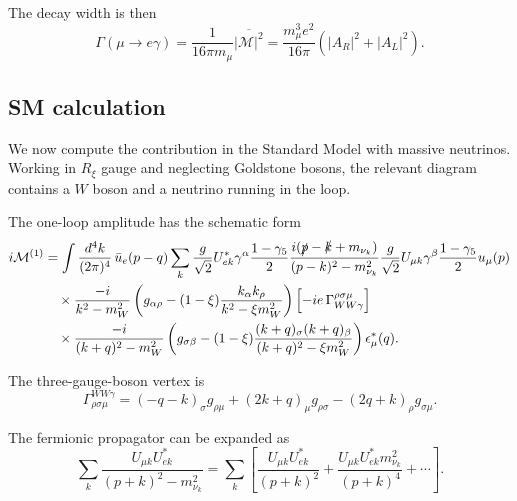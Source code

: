 \documentclass[11pt]{article}
\begin{document}
The decay width is then
\begin{equation}
    \Gamma(\mu \to e\gamma)
    =
    \frac{1}{16\pi m_\mu}
    \overline{|\mathcal{M}|^2}
    =
    \frac{m_\mu^3 e^2}{16\pi}
    \left(
        |A_R|^2 + |A_L|^2
    \right).
\end{equation}

\subsection*{SM calculation}

We now compute the contribution in the Standard Model with massive neutrinos. Working in $R_\xi$ gauge and neglecting Goldstone bosons, the relevant diagram contains a $W$ boson and a neutrino running in the loop.

The one-loop amplitude has the schematic form
\begin{align}
    i\mathcal{M}^{(1)}
    &=
    \int \frac{d^4k}{(2\pi)^4}\,
    \bar{u}_e(p-q)
    \sum_k
    \frac{g}{\sqrt{2}} U^*_{ek}
    \gamma^\alpha
    \frac{1-\gamma_5}{2}
    \frac{i(\slashed{p}-\slashed{k}+m_{\nu_k})}
    {(p-k)^2-m_{\nu_k}^2}
    \frac{g}{\sqrt{2}} U_{\mu k}
    \gamma^\beta
    \frac{1-\gamma_5}{2}
    u_\mu(p)
    \notag \\
    &\quad \times
    \frac{-i}{k^2-m_W^2}
    \left(
        g_{\alpha\rho}
        -
        (1-\xi)\frac{k_\alpha k_\rho}{k^2-\xi m_W^2}
    \right)
    \left[
        -ie\,\Gamma^{\rho\sigma\mu}_{WW\gamma}
    \right]
    \notag \\
    &\quad \times
    \frac{-i}{(k+q)^2-m_W^2}
    \left(
        g_{\sigma\beta}
        -
        (1-\xi)\frac{(k+q)_\sigma (k+q)_\beta}
        {(k+q)^2-\xi m_W^2}
    \right)
    \epsilon^*_\mu(q).
\end{align}

The three-gauge-boson vertex is
\begin{equation}
    \Gamma_{\rho\sigma\mu}^{WW\gamma}
    =
    (-q-k)_\sigma g_{\rho\mu}
    +
    (2k+q)_\mu g_{\rho\sigma}
    -
    (2q+k)_\rho g_{\sigma\mu}.
\end{equation}

The fermionic propagator can be expanded as
\begin{equation}
    \sum_k
    \frac{U_{\mu k}U^*_{ek}}
    {(p+k)^2-m_{\nu_k}^2}
    =
    \sum_k
    \left[
        \frac{U_{\mu k}U^*_{ek}}{(p+k)^2}
        +
        \frac{U_{\mu k}U^*_{ek}m_{\nu_k}^2}{(p+k)^4}
        + \cdots
    \right].
\end{equation}
\end{document}
